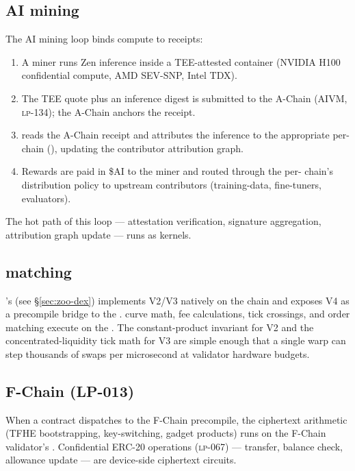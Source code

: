 \subsection{AI mining}

The \Zoo{} AI mining loop binds compute to receipts:

\begin{enumerate}[leftmargin=1.4em]
  \item A miner runs Zen inference inside a TEE-attested container
        (NVIDIA H100 confidential compute, AMD SEV-SNP, Intel TDX).
  \item The TEE quote plus an inference digest is submitted to the \Lux{}
        A-Chain (AIVM, \textsc{lp-134}); the A-Chain anchors the receipt.
  \item \Zoo{} reads the A-Chain receipt and attributes the inference
        to the appropriate per-\LLM{} chain (\cite{zoo-per-llm-chains}),
        updating the contributor attribution graph.
  \item Rewards are paid in \$AI to the miner and routed through the
        per-\LLM{} chain's distribution policy to upstream contributors
        (training-data, fine-tuners, evaluators).
\end{enumerate}

The hot path of this loop --- attestation verification, signature
aggregation, attribution graph update --- runs as \GPU{} kernels.

\subsection{\DEX{} matching}

\Zoo{}'s \DEX{} (see \S\ref{sec:zoo-dex}) implements \AMM{} V2/V3 natively
on the chain and exposes V4 as a precompile bridge to the \Lux{} \DEX{}
\cite{lux-dex}. \AMM{} curve math, fee calculations, tick crossings, and
order matching execute on the \GPU{}. The constant-product invariant for
V2 and the concentrated-liquidity tick math for V3 are simple enough that
a single warp can step thousands of swaps per microsecond at validator
hardware budgets.

\subsection{F-Chain \FHE{} (LP-013)}

When a \Zoo{} contract dispatches to the F-Chain \FHE{} precompile,
the ciphertext arithmetic (TFHE bootstrapping, key-switching, gadget
products) runs on the F-Chain validator's \GPU{}. Confidential ERC-20
operations (\textsc{lp-067}) --- transfer, balance check, allowance
update --- are device-side ciphertext circuits.

